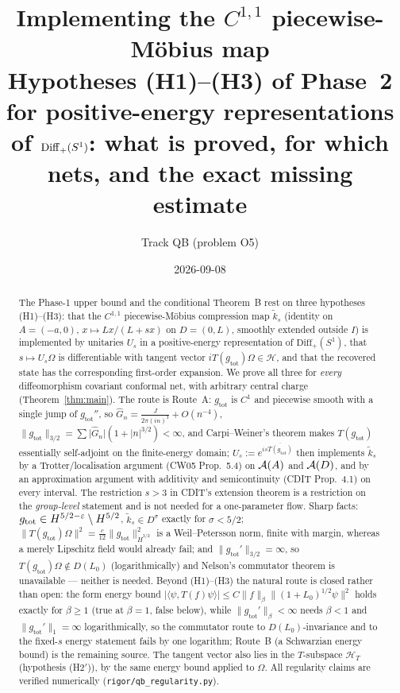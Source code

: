 \documentclass[11pt]{article}
\title{\color{navy}\bfseries Implementing the $C^{1,1}$ piecewise-M\"obius map\\[0.3em]
\large Hypotheses (H1)--(H3) of Phase~2 for positive-energy representations of $\Diff(S^1)$:
what is proved, for which nets, and the exact missing estimate}
\author{Track QB (problem O5)}\date{2026-09-08}
\newcommand{\Om}{\Omega}
\newcommand{\Hil}{\mathcal H}
\newcommand{\Diff}{\mathrm{Diff}_+}
\newcommand{\ip}[2]{\langle #1,#2\rangle}
\newcommand{\norm}[1]{\lVert #1\rVert}
\newcommand{\abs}[1]{\lvert #1\rvert}
\newcommand{\gtot}{g_{\mathrm{tot}}}
\newcommand{\ktil}{\widetilde k}
\begin{document}
\maketitle
\vspace{-1.2em}

\begin{abstract}\noindent
The Phase-1 upper bound and the conditional Theorem~B rest on three hypotheses (H1)--(H3): that the
$C^{1,1}$ piecewise-M\"obius compression map $\ktil_s$ (identity on $A=(-a,0)$, $x\mapsto Lx/(L+sx)$ on $D=(0,L)$,
smoothly extended outside $I$) is implemented by unitaries $U_s$ in a positive-energy representation of
$\Diff(S^1)$, that $s\mapsto U_s\Om$ is differentiable with tangent vector $iT(\gtot)\Om\in\Hil$, and that the
recovered state has the corresponding first-order expansion.  We prove all three for \emph{every} diffeomorphism
covariant conformal net, with arbitrary central charge (Theorem~\ref{thm:main}).  The route is Route~A:
$\gtot$ is $C^1$ and piecewise smooth with a single jump of $\gtot''$, so $\hat G_n=\frac J{2\pi(in)^3}+O(n^{-4})$,
$\norm\gtot_{3/2}=\sum\abs{\hat G_n}(1+\abs n^{3/2})<\infty$, and Carpi--Weiner's theorem makes $T(\gtot)$
essentially self-adjoint on the finite-energy domain; $U_s:=e^{is\overline{T(\gtot)}}$ then implements $\ktil_s$ by
a Trotter/localisation argument (CW05 Prop.~5.4) on $\mathcal A(A)$ and $\mathcal A(D)$, and by an approximation argument with
additivity and semicontinuity (CDIT Prop.~4.1) on every interval.  The restriction $s>3$ in CDIT's extension theorem
is a restriction on the \emph{group-level} statement and is not needed for a one-parameter flow.  Sharp facts:
$\gtot\in H^{5/2-\eps}\setminus H^{5/2}$, $\ktil_s\in D^\sigma$ exactly for $\sigma<5/2$;
$\norm{T(\gtot)\Om}^2=\frac c{12}\norm\gtot^2_{\dot H^{3/2}}$ is a Weil--Petersson norm, finite with margin, whereas
a merely Lipschitz field would already fail; and $\norm{\gtot'}_{3/2}=\infty$, so $T(\gtot)\Om\notin D(L_0)$
(logarithmically) and Nelson's commutator theorem is unavailable --- neither is needed.  Beyond (H1)--(H3) the natural route is closed rather than
open: the form energy bound $\abs{\ip\psi{T(f)\psi}}\le C\norm f_\beta\norm{(1+L_0)^{1/2}\psi}^2$ holds exactly for
$\beta\ge1$ (true at $\beta=1$, false below), while $\norm{\gtot'}_\beta<\infty$ needs $\beta<1$ and
$\norm{\gtot'}_1=\infty$ logarithmically, so the commutator route to $D(L_0)$-invariance and to the fixed-$s$ energy
statement fails by one logarithm; Route~B (a Schwarzian energy bound) is the remaining source.  The tangent vector
also lies in the $T$-subspace $\Hil_T$ (hypothesis (H2$'$)), by the same energy bound applied to $\Om$.  All regularity claims are verified numerically
(\texttt{rigor/qb\_regularity.py}).
\end{abstract}
\end{document}
